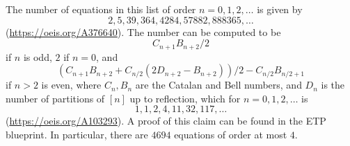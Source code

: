 The number of equations in this list of order $n=0,1,2,\dots$ is given by
$$ 2, 5, 39, 364, 4284, 57882, 888365, \dots$$
(\url{https://oeis.org/A376640}).  The number can be computed to be
$$ C_{n+1} B_{n+2}/2$$
if $n$ is odd, $2$ if $n=0$, and
$$ (C_{n+1} B_{n+2}+ C_{n/2}(2D_{n+2}-B_{n+2}))/2 - C_{n/2} B_{n/2+1}$$
if $n > 2$ is even, where $C_n, B_n$ are the Catalan and Bell numbers, and $D_n$ is the number of partitions of $[n]$ up to reflection, which for $n=0,1,2,\dots$ is
$$ 1, 1, 2, 4, 11, 32, 117, \dots$$
(\url{https://oeis.org/A103293}).  A proof of this claim can be found in the ETP blueprint.  In particular, there are $4694$ equations of order at most $4$.

